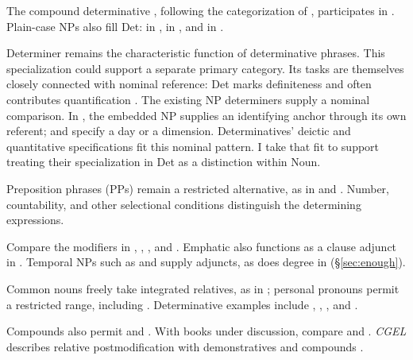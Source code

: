 \documentclass[12pt]{article}
\begin{document}
The compound determinative , following the categorization of \textcite[§1.3]{Payne2007}, participates in . Plain-case NPs also fill Det:  in ,  in , and  in  \citep[355, 357]{huddleston2002}.

Determiner remains the characteristic function of determinative phrases. This specialization could support a separate primary category. Its tasks are themselves closely connected with nominal reference: Det marks definiteness and often contributes quantification \citep[354--359]{huddleston2002}. The existing NP determiners supply a nominal comparison. In , the embedded NP supplies an identifying anchor through its own referent;  and  specify a day or a dimension. Determinatives' deictic and quantitative specifications fit this nominal pattern. I take that fit to support treating their specialization in Det as a distinction within Noun.

Preposition phrases (PPs) remain a restricted alternative, as in  and  \citep[357, 433]{huddleston2002}. Number, countability, and other selectional conditions distinguish the determining expressions.

Compare the modifiers in , , , and . Emphatic  also functions as a clause adjunct in  \citep[1496--1497]{huddleston2002}. Temporal NPs such as  and  supply adjuncts, as does degree  in  (§\ref{sec:enough}).

Common nouns freely take integrated relatives, as in ; personal pronouns permit a restricted range, including  \citep[430]{huddleston2002}. Determinative examples include , , , and .

Compounds also permit  and . With books under discussion, compare  and . \textit{CGEL} describes relative postmodification with demonstratives and compounds \citep[414, 422--423]{huddleston2002}.
\end{document}
